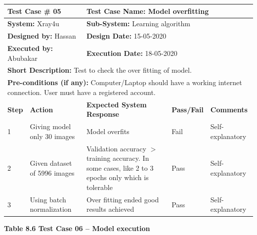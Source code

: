\documentclass{article} %
\begin{document}
\begin{tabular}{|p{0.3in}|p{1.0in}|p{1.7in}|p{0.5in}|p{0.6in}|} \hline 
\multicolumn{2}{|p{1in}|}{\textbf{Test Case \#} 05} & \multicolumn{3}{|p{2.9in}|}{\textbf{Test Case Name:} Model overfitting} \\ \hline 
\multicolumn{2}{|p{1in}|}{\textbf{System:} Xray4u} & \multicolumn{3}{|p{2.9in}|}{\textbf{Sub-System: }Learning algorithm} \\ \hline 
\multicolumn{2}{|p{1in}|}{\textbf{Designed by:} Hassan} & \multicolumn{3}{|p{2.9in}|}{\textbf{Design Date:} 15-05-2020} \\ \hline 
\multicolumn{2}{|p{1in}|}{\textbf{Executed by: }Abubakar} & \multicolumn{3}{|p{2.9in}|}{\textbf{Execution Date:} 18-05-2020} \\ \hline 
\multicolumn{5}{|p{1in}|}{\textbf{Short Description:} Test to check the over fitting of model.} \\ \hline 
\multicolumn{5}{|p{1in}|}{\textbf{Pre-conditions (if any):} Computer/Laptop should have a working internet connection. User must have a registered account.\textbf{}} \\ \hline 
\textbf{Step} & \textbf{Action} & \textbf{Expected System Response} & \textbf{Pass/Fail} & \textbf{Comments} \\ \hline 
1 & Giving model only 30 images & Model overfits & Fail & Self-explanatory \\ \hline 
2 & Given dataset of 5996 images & Validation accuracy $\mathrm{>}$ training accuracy. In some cases, like 2 to 3 epochs only which is tolerable & Pass & Self-explanatory \\ \hline 
3 & Using batch normalization & Over fitting ended good results achieved & Pass & Self-explanatory \\ \hline 
\end{tabular}

\eject 

\noindent \textbf{Table 8.6 Test Case 06 -- Model execution}
\end{document}
